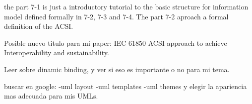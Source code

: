 the part 7-1 is just a 
introductory tutorial 
to the basic structure for 
information model defined formally in 
7-2, 7-3 and 7-4.
The part 7-2 aproach a formal definition of
the ACSI.




Posible nuevo titulo para mi paper:
IEC 61850 ACSI approach to 
achieve Interoperability 
and sustainability.



Leer sobre dinamic binding, y ver 
si eso es importante o no 
para mi tema.


buscar en google:
-uml layout
-uml templates
-uml themes
y elegir la apariencia 
mas adecuada para mis UMLs.
